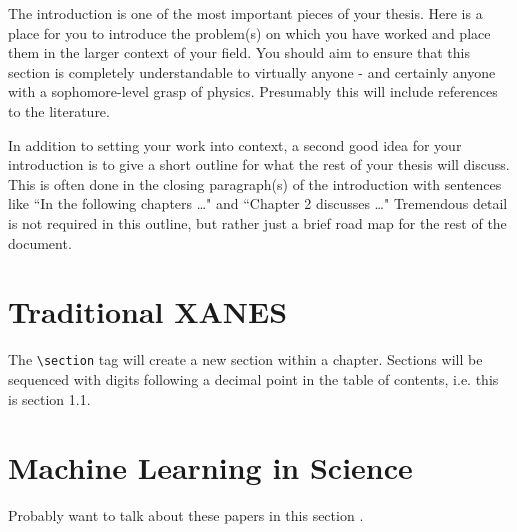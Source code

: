 
The introduction is one of the most important pieces of your thesis.  Here is a place for you to introduce the problem(s) on which you have worked and place them in the larger context of your field.  You should aim to ensure that this section is completely understandable to virtually anyone - and certainly anyone with a sophomore-level grasp of physics.  Presumably this will include references to the literature.

In addition to setting your work into context, a second good idea for your introduction is to give a short outline for what the rest of your thesis will discuss.  This is often done in the closing paragraph(s) of the introduction with sentences like ``In the following chapters \ldots " and ``Chapter 2 discusses \ldots"  Tremendous detail is not required in this outline, but rather just a brief road map for the rest of the document.

\section{Traditional XANES}

The \texttt{\textbackslash section} tag will create a new section within a chapter.  Sections will be sequenced with digits following a decimal point in the table of contents, i.e. this is section 1.1.


\section{Machine Learning in Science}


Probably want to talk about these papers in this section \cite{timoshenko2018neural} \cite{Timoshenko2017}.

